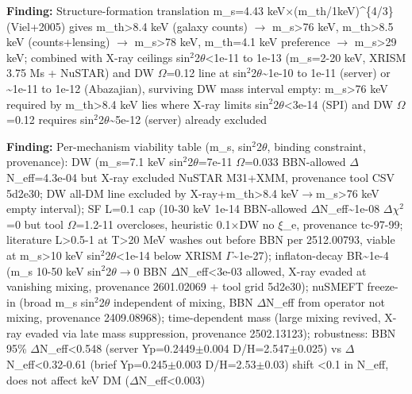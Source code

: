 \documentclass[11pt,a4paper]{article}
\begin{document}
\textbf{Finding:} Structure-formation translation m\_s=4.43 keV$\times$(m\_th/1keV)\textasciicircum{}\{4/3\} (Viel+2005) gives m\_th\textgreater{}8.4 keV (galaxy counts) $\to$ m\_s\textgreater{}76 keV, m\_th\textgreater{}8.5 keV (counts+lensing) $\to$ m\_s\textgreater{}78 keV, m\_th=4.1 keV preference $\to$ m\_s\textgreater{}29 keV; combined with X-ray ceilings sin$^2$2$\theta$\textless{}1e-11 to 1e-13 (m\_s=2-20 keV, XRISM 3.75 Ms + NuSTAR) and DW $\Omega$=0.12 line at sin$^2$2$\theta$\textasciitilde{}1e-10 to 1e-11 (server) or \textasciitilde{}1e-11 to 1e-12 (Abazajian), surviving DW mass interval empty: m\_s\textgreater{}76 keV required by m\_th\textgreater{}8.4 keV lies where X-ray limits sin$^2$2$\theta$\textless{}3e-14 (SPI) and DW $\Omega$=0.12 requires sin$^2$2$\theta$\textasciitilde{}5e-12 (server) already excluded

\textbf{Finding:} Per-mechanism viability table (m\_s, sin$^2$2$\theta$, binding constraint, provenance): DW (m\_s=7.1 keV sin$^2$2$\theta$=7e-11 $\Omega$=0.033 BBN-allowed $\Delta$N\_eff=4.3e-04 but X-ray excluded NuSTAR M31+XMM, provenance tool CSV 5d2e30; DW all-DM line excluded by X-ray+m\_th\textgreater{}8.4 keV$\to$m\_s\textgreater{}76 keV empty interval); SF L=0.1 cap (10-30 keV 1e-14 BBN-allowed $\Delta$N\_eff\textasciitilde{}1e-08 $\Delta$$\chi$$^2$=0 but tool $\Omega$=1.2-11 overcloses, heuristic 0.1$\times$DW no $\xi$\_e, provenance tc-97-99; literature L\textgreater{}0.5-1 at T\textgreater{}20 MeV washes out before BBN per 2512.00793, viable at m\_s\textgreater{}10 keV sin$^2$2$\theta$\textless{}1e-14 below XRISM $\Gamma$\textasciitilde{}1e-27); inflaton-decay BR\textasciitilde{}1e-4 (m\_s 10-50 keV sin$^2$2$\theta$$\to$0 BBN $\Delta$N\_eff\textless{}3e-03 allowed, X-ray evaded at vanishing mixing, provenance 2601.02069 + tool grid 5d2e30); nuSMEFT freeze-in (broad m\_s sin$^2$2$\theta$ independent of mixing, BBN $\Delta$N\_eff from operator not mixing, provenance 2409.08968); time-dependent mass (large mixing revived, X-ray evaded via late mass suppression, provenance 2502.13123); robustness: BBN 95\% $\Delta$N\_eff\textless{}0.548 (server Yp=0.2449$\pm$0.004 D/H=2.547$\pm$0.025) vs $\Delta$N\_eff\textless{}0.32-0.61 (brief Yp=0.245$\pm$0.003 D/H=2.53$\pm$0.03) shift \textless{}0.1 in N\_eff, does not affect keV DM ($\Delta$N\_eff\textless{}0.003)
\end{document}
